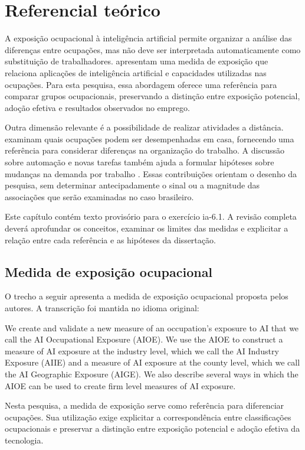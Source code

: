 \section{Referencial teórico}
\label{sec:referencial}

A exposição ocupacional à inteligência artificial permite organizar a análise das diferenças entre ocupações, mas não deve ser interpretada automaticamente como substituição de trabalhadores.  apresentam uma medida de exposição que relaciona aplicações de inteligência artificial e capacidades utilizadas nas ocupações. Para esta pesquisa, essa abordagem oferece uma referência para comparar grupos ocupacionais, preservando a distinção entre exposição potencial, adoção efetiva e resultados observados no emprego.

Outra dimensão relevante é a possibilidade de realizar atividades a distância.  examinam quais ocupações podem ser desempenhadas em casa, fornecendo uma referência para considerar diferenças na organização do trabalho. A discussão sobre automação e novas tarefas também ajuda a formular hipóteses sobre mudanças na demanda por trabalho \parencite{acemoglu2019}. Essas contribuições orientam o desenho da pesquisa, sem determinar antecipadamente o sinal ou a magnitude das associações que serão examinadas no caso brasileiro.

Este capítulo contém texto provisório para o exercício ia-6.1. A revisão completa deverá aprofundar os conceitos, examinar os limites das medidas e explicitar a relação entre cada referência e as hipóteses da dissertação.
\subsection{Medida de exposição ocupacional}

O trecho a seguir apresenta a medida de exposição ocupacional proposta pelos autores. A transcrição foi mantida no idioma original:

\begin{citacao}
We create and validate a new measure of an occupation's exposure to AI that we call the AI Occupational Exposure (AIOE). We use the AIOE to construct a measure of AI exposure at the industry level, which we call the AI Industry Exposure (AIIE) and a measure of AI exposure at the county level, which we call the AI Geographic Exposure (AIGE). We also describe several ways in which the AIOE can be used to create firm level measures of AI exposure.
\parencite[p.~2195]{felten2021}
\end{citacao}

Nesta pesquisa, a medida de exposição serve como referência para diferenciar ocupações. Sua utilização exige explicitar a correspondência entre classificações ocupacionais e preservar a distinção entre exposição potencial e adoção efetiva da tecnologia.